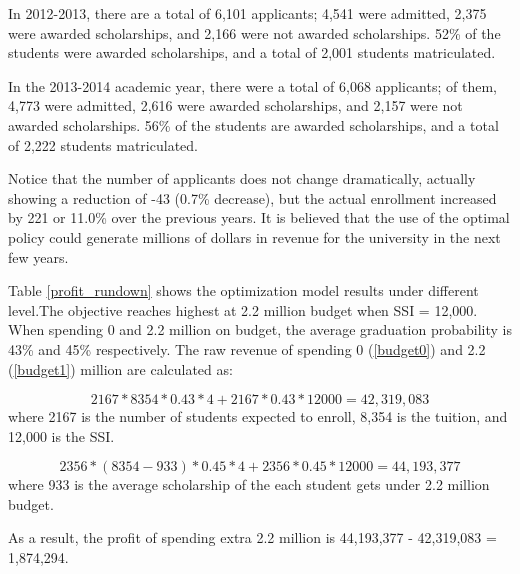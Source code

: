 \documentclass[12pt,english]{report}
\begin{document}
In 2012-2013, there are a total of 6,101 applicants; 4,541  were admitted,
2,375 were awarded scholarships, and 2,166 were not awarded scholarships.
52\% of the students were awarded scholarships, and a total of 2,001
students matriculated.

In the 2013-2014 academic year, there were a total of 6,068 applicants; of them,
4,773 were admitted, 2,616 were awarded scholarships, and 2,157 were not awarded 
scholarships. 56\% of the students are awarded scholarships, and a total of 2,222
students matriculated.

Notice that the number of applicants does not change dramatically, actually
showing a reduction of -43 (0.7\% decrease), but the actual enrollment increased
by 221  or 11.0\% over the previous years.  It is believed that the use of the
optimal policy could generate millions of dollars  in revenue for the
university in the next few years.


Table \ref{profit_rundown} shows the optimization model results under different 
level.The objective reaches highest at 2.2 million budget when SSI = 12,000.
When spending 0 and 2.2 million on budget, the average graduation probability is 
43\% and 45\% respectively. The raw revenue of spending 0 (\ref{budget0}) and 2.2 
(\ref{budget1}) million are calculated as:

\begin{equation}	
2167 * 8354 * 0.43 * 4 + 2167 * 0.43*12000 = 42,319,083
\label{budget0}
\end{equation}
where 2167 is the number of students expected to enroll, 8,354 is the tuition, and 12,000
is the SSI.

\begin{equation}
2356  * (8354-933)* 0.45* 4  + 2356 * 0.45*12000 = 44,193,377
\label{budget1}
\end{equation}
where 933 is the average scholarship of the each student gets under 2.2 million budget.

As a result, the profit of spending extra 2.2 million is 44,193,377 - 42,319,083 = 1,874,294.
\end{document}
